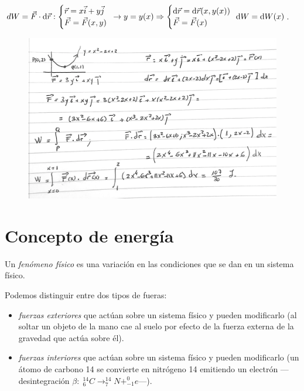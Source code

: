 \vspace{-4mm}\noindent \small{\textcolor{gris}{$dW=\vec F \cdot \dd \vec r:\begin{cases}  \vec r=x\vec i +y \vec j \\  \vec F=\vec F(x,y) \end{cases} \hspace{-2mm}\to  y=y(x) \Rightarrow  \begin{cases} \dd \vec r=\dd \vec r(x,y(x)) \\ \vec F=\vec F(x) \end{cases} \hspace{-2mm} \dd W= \dd W(x)$}\normalsize{.}}

\begin{figure}[H]
		\centering
		\includegraphics[width=.8\textwidth]{imagenes/imagenes03/T03IM13.png}
		\end{figure}

\section{Concepto de energía}

\normalsize{Un} \emph{fenómeno físico} es una variación en las condiciones que se dan en un sistema físico.

Podemos distinguir entre dos tipos de fueras:

\vspace{-2mm}\begin{itemize}
\vspace{-2mm}\item \emph{fuerzas exteriores} que actúan sobre un sistema físico y pueden modificarlo (al soltar un objeto de la mano cae al suelo por efecto de la fuerza externa de la gravedad que actúa sobre él).
\vspace{-2mm}\item \emph{fuerzas interiores} que actúan sobre un sistema físico y pueden modificarlo 	(un átomo de carbono 14 se convierte en nitrógeno 14 emitiendo un electrón --- desintegración $\beta:\; ^{14}_6C \to ^{14}_7N+^0_{-1}e$---).
\end{itemize}


